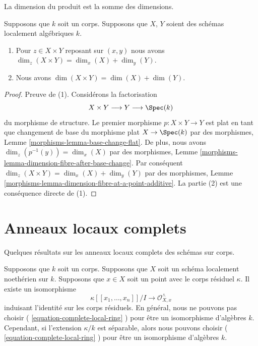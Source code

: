 \begin{lemma}
\label{lemma-dimension-product-locally-algebraic}
\begin{slogan}
La dimension du produit est la somme des dimensions.
\end{slogan}
Supposons que $k$ soit un corps. Supposons que $X$, $Y$ soient des schémas localement algébriques $k$.
\begin{enumerate}
\item Pour $z \in X \times Y$ reposant sur $(x, y)$
nous avons $\dim_z(X \times Y) = \dim_x(X) + \dim_y(Y)$.
\item Nous avons $\dim(X \times Y) = \dim(X) + \dim(Y)$.
\end{enumerate}
\end{lemma}

\begin{proof}
Preuve de (1). Considérons la factorisation
$$
X \times Y \longrightarrow Y \longrightarrow \Spec(k)
$$
du morphisme de structure. Le premier morphisme $p : X \times Y \to
Y$ est plat en tant que changement de base du morphisme plat $X \to
\Spec(k)$ par des morphismes, Lemme
\ref{morphisms-lemma-base-change-flat}. De plus, nous avons
$\dim_z(p^{-1}(y)) = \dim_x(X)$ par des morphismes, Lemme
\ref{morphisms-lemma-dimension-fibre-after-base-change}. Par conséquent $\dim_z(X
\times Y) = \dim_x(X) + \dim_y(Y)$ par des morphismes, Lemme
\ref{morphisms-lemma-dimension-fibre-at-a-point-additive}. La partie (2) est une conséquence directe de (1).
\end{proof}






\section{Anneaux locaux complets}
\label{section-complete-local-rings}

\noindent
Quelques résultats sur les anneaux locaux complets des schémas sur corps.

\begin{lemma}
\label{lemma-complete-local-ring-structure-as-algebra}
Supposons que $k$ soit un corps. Supposons que $X$ soit un
schéma localement noethérien sur $k$. Supposons que $x \in X$ soit
un point avec le corps résiduel $\kappa$. Il existe un isomorphisme
\begin{equation}
\label{equation-complete-local-ring}
\kappa[[x_1, \ldots, x_n]]/I \longrightarrow \mathcal{O}_{X, x}^\wedge
\end{equation}
induisant l'identité sur les corps résiduels. En général, nous ne
pouvons pas choisir ( \ref{equation-complete-local-ring} ) pour
être un isomorphisme d'algèbres $k$. Cependant, si l'extension
$\kappa/k$ est séparable, alors nous pouvons choisir (
\ref{equation-complete-local-ring} ) pour être un isomorphisme d'algèbres $k$.
\end{lemma}

